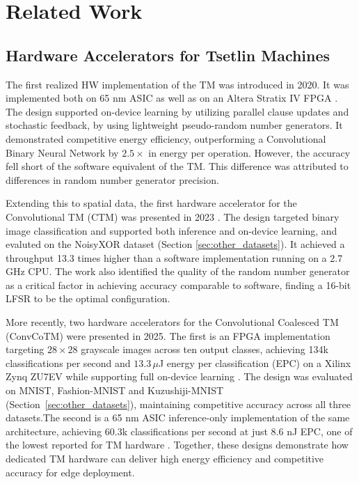 \section{Related Work}  
\label{sec:related_work}

\subsection{Hardware Accelerators for Tsetlin Machines}
\label{sec:related_hw}

The first realized HW implementation of the TM was introduced in 2020. It was implemented both on 65 nm ASIC as well as on an Altera Stratix IV FPGA \cite{WheeldonAdrian2020Labe}. The design supported on-device learning by utilizing parallel clause updates and stochastic feedback, by using lightweight pseudo-random number generators. It demonstrated competitive energy efficiency, outperforming a Convolutional Binary Neural Network by $2.5\times$ in energy per operation. However, the accuracy fell short of the software equivalent of the TM. This difference was attributed to differences in random number generator precision.

Extending this to spatial data, the first hardware accelerator for the Convolutional TM (CTM) \cite{GranmoOle-Christoffer2019TCTM} was presented in 2023 \cite{TunheimSveinAnders2023CTMT}. The design targeted binary image classification and supported both inference and on-device learning, and evaluted on the NoisyXOR dataset (Section \ref{sec:other_datasets}). It achieved a throughput 13.3 times higher than a software implementation running on a 2.7 GHz CPU. The work also identified the quality of the random number generator as a critical factor in achieving accuracy comparable to software, finding a 16-bit LFSR to be the optimal configuration. 

More recently, two hardware accelerators for the Convolutional Coalesced TM (ConvCoTM) \cite{GlimsdalSondre2021CMTM} were presented in 2025. The first is an FPGA implementation targeting $28 \times 28$ grayscale images across ten output classes, achieving 134k classifications per second and $13.3\,\mu$J energy per classification (EPC) on a Xilinx Zynq ZU7EV while supporting full on-device learning \cite{TunheimSveinAnders2025TMIC}. The design was evaluated on MNIST, Fashion-MNIST and Kuzushiji-MNIST (Section~\ref{sec:other_datasets}), maintaining competitive accuracy across all three datasets.The second is a 65 nm ASIC inference-only implementation of the same architecture, achieving 60.3k classifications per second at just 8.6 nJ EPC, one of the lowest reported for TM hardware \cite{AndersTunheimSvein2025AA86}. Together, these designs demonstrate how dedicated TM hardware can deliver high energy efficiency and competitive accuracy for edge deployment. 

